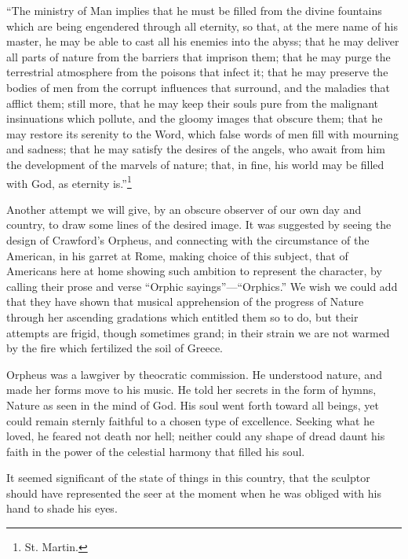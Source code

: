 ``The ministry of Man implies that he must be filled from the divine
fountains which are being engendered through all eternity, so that, at
the mere name of his master, he may be able to cast all his enemies
into the abyss; that he may deliver all parts of nature from the
barriers that imprison them; that he may purge the terrestrial
atmosphere from the poisons that infect it; that he may preserve the
bodies of men from the corrupt influences that surround, and the
maladies that afflict them; still more, that he may keep their souls
pure from the malignant insinuations which pollute, and the gloomy
images that obscure them; that he may restore its serenity to the
Word, which false words of men fill with mourning and sadness; that he
may satisfy the desires of the angels, who await from him the
development of the marvels of nature; that, in fine, his world may be
filled with God, as eternity is.''\footnote{St. Martin.}

Another attempt we will give, by an obscure observer  of our
own day and country, to draw some lines of the desired image. It was
suggested by seeing the design of Crawford's Orpheus, and connecting
with the circumstance of the American, in his garret at Rome, making
choice of this subject, that of Americans here at home showing such
ambition to represent the character, by calling their prose and verse
``Orphic sayings''---``Orphics.'' We wish we could add that they
have shown that musical apprehension of the progress of Nature through
her ascending gradations which entitled them so to do, but their
attempts are frigid, though sometimes grand; in their strain we are
not warmed by the fire which fertilized the soil of Greece.

Orpheus was a lawgiver by theocratic commission. He understood nature,
and made her forms move to his music. He told her secrets in the form
of hymns, Nature as seen in the mind of God. His soul went forth
toward all beings, yet could remain sternly faithful to a chosen type
of excellence. Seeking what he loved, he feared not death nor hell;
neither could any shape of dread daunt his faith in the power of the
celestial harmony that filled his soul.

It seemed significant of the state of things in this country, that the
sculptor should have represented the seer at the moment when he was
obliged with his hand to shade his eyes.


